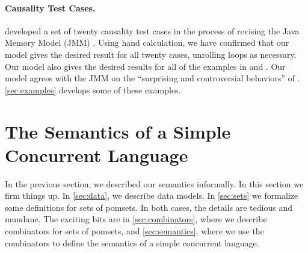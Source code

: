 \paragraph{Causality Test Cases. } 
\citet{PughWebsite} developed a set of twenty {causality test cases} in the
process of revising the Java Memory Model (JMM)
\cite{Manson:2005:JMM:1047659.1040336}.  Using hand calculation, we have
confirmed that our model gives the desired result for all twenty cases,
unrolling loops as necessary.  Our model also gives the desired results for
all of the examples in \citet[]{DBLP:conf/esop/BattyMNPS15} and
\citet[]{SevcikThesis}.  Our model agrees with the JMM on the
``surprising and controversial behaviors'' of \citet[]{Manson:2005:JMM:1047659.1040336}. \textsection\ref{sec:examples} develops some of these examples.

\section{The Semantics of a Simple Concurrent Language}
\label{sec:model}

In the previous section, we described our semantics informally.  In this
section we firm things up.  In \textsection\ref{sec:data}, we describe data
models.  In \textsection\ref{sec:sets} we formalize some definitions for sets
of pomsets.  In both cases, the details are tedious and mundane.  The
exciting bits are in \textsection\ref{sec:combinators}, where we describe
combinators for sets of pomsets, and \textsection\ref{sec:semantics}, where
we use the combinators to define the semantics of a simple concurrent
language.
 
\begin{comment}
Differences with \cite{2019-sp}:
\begin{itemize}
\item We only consider pomsets where $\lt$-greater elements have stronger
  preconditions (Definition~\ref{def:mmpomset}).
\item We only consider pomsets that are coherent (Definition~\ref{def:mmpomset}).
\item Prefixing only introduces required order from read to write in item~\ref{pre-read}b (Definition~\ref{def:prefix}).
\item Prefixing allows writes to weaken preconditions in item~\ref{pre-write} (Definition~\ref{def:prefix}).
\item We provide semantics for computed addresses of memory locations.
\item The semantics of relaxed read introduces internal actions.
\item Restriction introduces internal actions.
\item The semantics of parallel composition requires that the constituent
  pomsets be location independent.  This ensures that in
  $\aCmd;(\bCmd_1\PAR\bCmd_2)$, that there are no internal reads from any
  write in $\aCmd$ to any read in any $\bCmd_i$.
\end{itemize}
\end{comment}

